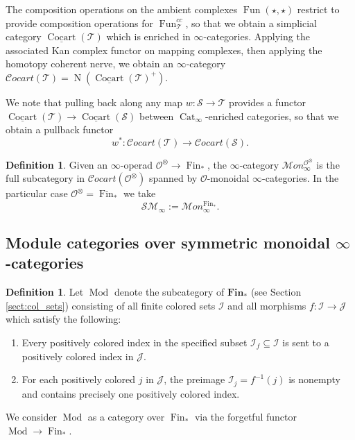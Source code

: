 \documentclass[reqno]{amsart}
\theoremstyle{definition}
\newtheorem{definition}[lemma]{Definition}
\newcommand{\mcl}[1]{\mathcal{#1}}
\newcommand{\msc}[1]{\mathscr{#1}}
\newcommand{\mbf}[1]{\mathbf{#1}}
\newcommand{\opn}[1]{\operatorname{#1}}
\newcommand{\ot}{\otimes}
\newcommand{\SM}{\mathscr{S}\!\!\mathscr{M}}
\DeclareMathOperator{\Fun}{Fun}
\DeclareMathOperator{\Fin}{Fin}
\renewcommand{\1}{\mathbf{1}}
\begin{document}
The composition operations on the ambient complexes $\Fun(\star,\star)$ restrict to provide composition operations for $\Fun_{\msc{T}}^{cc}$, so that we obtain a simplicial category $\underline{\opn{Cocart}}(\msc{T})$ which is enriched in $\infty$-categories.  Applying the associated Kan complex functor on mapping complexes, then applying the homotopy coherent nerve, we obtain an $\infty$-category $\msc{C}\!ocart(\msc{T})=\opn{N}(\underline{\opn{Cocart}}(\msc{T})^+)$.
\par

We note that pulling back along any map $w:\msc{S}\to \msc{T}$ provides a functor $\underline{\opn{Cocart}}(\msc{T})\to \underline{\opn{Cocart}}(\msc{S})$ between $\opn{Cat}_{\infty}$-enriched categories, so that we obtain a pullback functor
\[
w^{\ast}:\msc{C}\!ocart(\msc{T})\to \msc{C}\!ocart(\msc{S}).
\]


\begin{definition}\label{def:sm_infty}
Given an $\infty$-operad $\msc{O}^{\ot}\to \Fin_{\ast}$, the $\infty$-category $\msc{M}\!on_{\infty}^{\msc{O}^{\ot}}$ is the full subcategory in $\msc{C}\!ocart(\msc{O}^{\ot})$ spanned by $\msc{O}$-monoidal $\infty$-categories.  In the particular case $\msc{O}^{\ot}=\Fin_{\ast}$ we take
\[
\SM_{\infty}:=\msc{M}\!on_{\infty}^{\Fin_{\ast}}.
\]
\end{definition}

\subsection{Module categories over symmetric monoidal $\infty$-categories}

\begin{definition}\label{def:mod}
Let $\opn{Mod}$ denote the subcategory of $\mbf{Fin}_{\ast}$ (see Section \ref{sect:col_sets}) consisting of all finite colored sets $\mcl{I}$ and all morphisms $f:\mcl{I}\to \mcl{J}$ which satisfy the following:
\begin{enumerate}
\item[(a)] Every positively colored index in the specified subset $\mcl{I}_{f}\subseteq \mcl{I}$ is sent to a positively colored index in $\mcl{J}$. 
\item[(b)] For each positively colored $j$ in $\mcl{J}$, the preimage $\mcl{I}_j=f^{-1}(j)$ is nonempty and contains precisely one positively colored index.
\end{enumerate}
We consider $\opn{Mod}$ as a category over $\Fin_{\ast}$ via the forgetful functor $\opn{Mod}\to \Fin_{\ast}$.
\end{definition}
\end{document}
